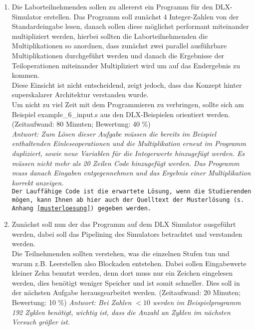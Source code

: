 \documentclass[a4paper,ngerman]{scrartcl}
\begin{document}
\begin{enumerate}
    \item Die Laborteilnehmenden sollen zu allererst ein Programm für den DLX-Simulator erstellen.
    Das Programm soll zunächst 4 Integer-Zahlen von der Standardeingabe lesen, danach sollen diese möglichst performant miteinander multipliziert werden, hierbei sollten die Laborteilnehmenden die Multiplikationen so anordnen, dass zunächst zwei parallel ausführbare Multiplikationen durchgeführt werden und danach die Ergebnisse der Teiloperationen miteinander Multipliziert wird um auf das Endergebnis zu kommen. \\
    Diese Einsicht ist nicht entscheidend, zeigt jedoch, dass das Konzept hinter superskalarer Architektur verstanden wurde. \\
    Um nicht zu viel Zeit mit dem Programmieren zu verbringen, sollte sich am Beispiel example\_6\_input.s aus den DLX-Beispielen orientiert werden.
   \newline (Zeitaufwand: 80 Minuten; Bewertung: 40 \%) \\
   \textit{Antwort: Zum Lösen dieser Aufgabe müssen die bereits im Beispiel enthaltenden Einleseoperationen und die Multiplikation erneut im Programm dupliziert, sowie neue Variablen für die Integerwerte hinzugefügt werden. Es müssen nicht mehr als 20 Zeilen Code hinzugefügt werden. Das Programm muss danach Eingaben entgegennehmen und das Ergebnis einer Multiplikation korrekt anzeigen.}\\
   \texttt{Der Lauffähige Code ist die erwartete Lösung, wenn die Studierenden mögen, kann Ihnen ab hier auch der Quelltext der Musterlösung (s. Anhang \ref{musterloesung}) gegeben werden.}
   \item Zunächst soll nun der das Programm auf dem DLX Simulator ausgeführt werden, dabei soll das Pipelining des Simulators betrachtet und verstanden werden. \\ 
   Die Teilnehmenden sollten verstehen, was die einzelnen Stufen tun und warum z.B. Leerstellen also Blockaden entstehen. Dabei sollen Eingabewerte kleiner Zehn benutzt werden, denn dort muss nur ein Zeichen eingelesen werden, dies benötigt weniger Speicher und ist somit schneller. Dies soll in der nächsten Aufgabe herausgearbeitet werden. 
   \newline (Zeitaufwand: 20 Minuten; Bewertung: 10 \%) 
   \newline
   \textit{Antwort: Bei Zahlen $< 10$ werden im Beispielprogramm 192 Zyklen benötigt, wichtig ist, dass die Anzahl an Zyklen im nächsten Versuch größer ist.}\\

\end{enumerate}
\end{document}
